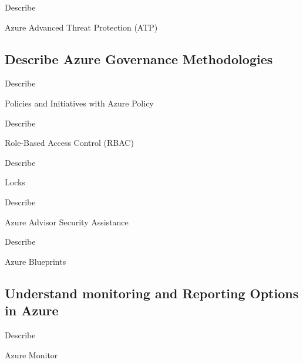 \documentclass{scrartcl}
\newenvironment{flashcard}[2][]{%
    #1
    \vfill
    \centerline{\Large{#2}}
    \vfill
    \newpage
}
{\newpage}
\newcommand{\subsectioncard}[1]{
    \vspace*{\stretch{1}}
    \subsection{#1}
    \vspace*{\stretch{1}}
    \pagebreak
}
\begin{document}
    \begin{flashcard}[Describe]{Azure Advanced Threat Protection (ATP)}

    \end{flashcard}

    \subsectioncard{Describe Azure Governance Methodologies}

    \begin{flashcard}[Describe]{Policies and Initiatives with Azure Policy}

    \end{flashcard}

    \begin{flashcard}[Describe]{Role-Based Access Control (RBAC)}

    \end{flashcard}

    \begin{flashcard}[Describe]{Locks}

    \end{flashcard}

    \begin{flashcard}[Describe]{Azure Advisor Security Assistance}

    \end{flashcard}

    \begin{flashcard}[Describe]{Azure Blueprints}

    \end{flashcard}

    \subsectioncard{Understand monitoring and Reporting Options in Azure}

    \begin{flashcard}[Describe]{Azure Monitor}

    \end{flashcard}
\end{document}
